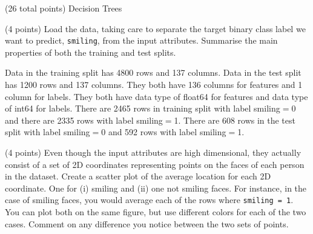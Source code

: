 \documentclass[12pt]{article}
\begin{document}
\clearpage


\begin{question}{(26 total points) Decision Trees}





%
%
\begin{subquestion}{(4 points) Load the data, taking care to separate the target binary class label we want to predict, \texttt{smiling}, from the input attributes. 
Summarise the main properties of both the training and test splits. 
}


\begin{answerbox}{12em}

Data in the training split has 4800 rows and 137 columns. Data in the test split has 1200 rows and 137 columns. They both have 136 columns for features and 1 column for labels. They both have data type of float64 for features and data type of int64 for labels. There are 2465 rows in training split with label smiling$=$0 and there are 2335 rows with label smiling$=$1. There are 608 rows in the test split with label smiling$=$0 and 592 rows with label smiling$=$1.
\end{answerbox}



\end{subquestion}


%
%
\begin{subquestion}{(4 points) Even though the input attributes are high dimensional, they actually consist of a set of 2D coordinates representing points on the faces of each person in the dataset. 
Create a scatter plot of the average location for each 2D coordinate. One for (i) smiling and (ii) one not smiling faces. 
For instance, in the case of smiling faces, you would average each of the rows where \texttt{smiling = 1}. 
You can plot both on the same figure, but use different colors for each of the two cases. 
Comment on any difference you notice between the two sets of points. \\
}



\end{subquestion}
\end{question}
\end{document}
